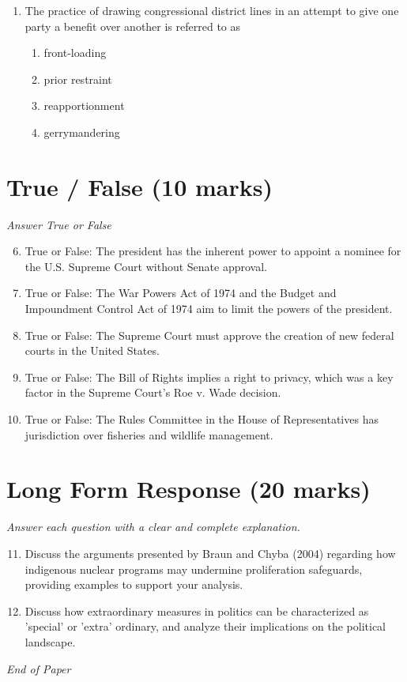 \documentclass[12pt]{article}
\begin{document}
\begin{enumerate}[label=\arabic*.]
\begin{enumerate}[label=(\alph*)]
    \item income equality
    \item democracy
    \item individual liberty
    \item due process
\end{enumerate}
\item The practice of drawing congressional district lines in an attempt to give one party a benefit over another is referred to as
\begin{enumerate}[label=(\alph*)]
    \item front-loading
    \item prior restraint
    \item reapportionment
    \item gerrymandering
\end{enumerate}
\end{enumerate}

\section*{True / False (10 marks)}
\textit{Answer True or False}
\begin{enumerate}[label=\arabic*.]
\setcounter{enumi}{5}
\item True or False: The president has the inherent power to appoint a nominee for the U.S. Supreme Court without Senate approval.
\item True or False: The War Powers Act of 1974 and the Budget and Impoundment Control Act of 1974 aim to limit the powers of the president.
\item True or False: The Supreme Court must approve the creation of new federal courts in the United States.
\item True or False: The Bill of Rights implies a right to privacy, which was a key factor in the Supreme Court's Roe v. Wade decision.
\item True or False: The Rules Committee in the House of Representatives has jurisdiction over fisheries and wildlife management.
\end{enumerate}

\section*{Long Form Response (20 marks)}
\textit{Answer each question with a clear and complete explanation.}
\begin{enumerate}[label=\arabic*.]
\setcounter{enumi}{10}
\item Discuss the arguments presented by Braun and Chyba (2004) regarding how indigenous nuclear programs may undermine proliferation safeguards, providing examples to support your analysis.
\item Discuss how extraordinary measures in politics can be characterized as 'special' or 'extra' ordinary, and analyze their implications on the political landscape.
\end{enumerate}

\vfill
\noindent\textit{End of Paper}
\end{document}
